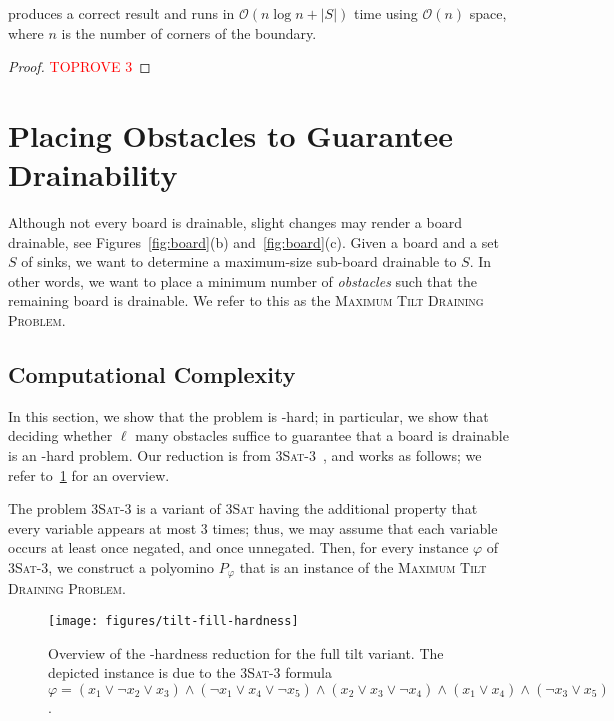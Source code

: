 \documentclass[a4paper,UKenglish,cleveref,thm-restate]{lipics-v2021}
\newcommand{\BigO}{\mathcal{O}}
\newcommand{\drainingProb}{\textsc{Maximum Tilt Draining Problem}}
\begin{document}
\begin{theorem}
    \label{lem:alg-min-sinks-correct}
     produces a correct result and runs in \(\BigO(n \log n +
    |S|)\) time using $\BigO(n)$ space, where $n$ is the number of corners of the
    boundary.
\end{theorem}
\begin{proof}\textcolor{red}{TOPROVE 3}\end{proof}
     \section{Placing Obstacles to Guarantee Drainability}\label{sec:obstacles}

Although not every board is drainable, slight changes may render a board drainable, see Figures~\ref{fig:board}(b) and~\ref{fig:board}(c). 
Given a board and a set $S$ of sinks, we want to determine a maximum-size sub-board drainable to $S$. 
In other words, we want to place a minimum number of \emph{obstacles}
such that the remaining board is drainable.
We refer to this as the \drainingProb.

\subsection{Computational Complexity}

In this section, we show that the problem is \NP-hard; in particular, we show that deciding whether $\ell$ many obstacles suffice to guarantee that a board is drainable is an \NP-hard problem.
Our reduction is from \textsc{3Sat-3}~\cite{tovey1984simplified}, and works as follows; we refer to~\cref{fig:hardness-example} for an overview.

The problem \textsc{3Sat-3} is a variant of \textsc{3Sat} having the additional property that every variable appears at most $3$ times; thus, we may assume that each variable occurs at least once negated, and once unnegated.
Then, for every instance $\varphi$ of \textsc{3Sat-3}, we construct a polyomino $P_{\varphi}$ that is an instance of the \drainingProb.

\begin{figure}[htb]
	\centering
	\texttt{[image: figures/tilt-fill-hardness]}
	\caption{Overview of the \NP-hardness reduction for the full tilt variant. 
		The depicted instance is due to the \textsc{3Sat-3} formula $\varphi = (x_1 \lor \neg x_2 \lor x_3) \land (\neg x_1 \lor x_4 \lor \neg x_5) \land (x_2 \lor x_3 \lor \neg x_4) \land (x_1 \lor x_4) \land (\neg x_3 \lor x_5)$.
	}
	\label{fig:hardness-example}
\end{figure}
\end{document}
